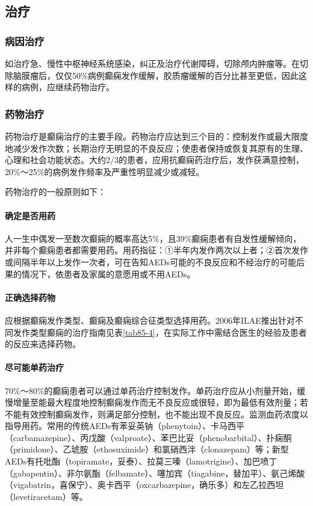 \subsection{治疗}

\subsubsection{病因治疗}

如治疗急、慢性中枢神经系统感染，纠正及治疗代谢障碍，切除颅内肿瘤等。在切除脑膜瘤后，仅仅50\%病例癫痫发作缓解，胶质瘤缓解的百分比甚至更低，因此这样的病例，应继续药物治疗。

\subsubsection{药物治疗}

药物治疗是癫痫治疗的主要手段。药物治疗应达到三个目的：控制发作或最大限度地减少发作次数；长期治疗无明显的不良反应；使患者保持或恢复其原有的生理、心理和社会功能状态。大约2/3的患者，应用抗癫痫药治疗后，发作获满意控制，20\%～25\%的病例发作频率及严重性明显减少或减轻。

药物治疗的一般原则如下：

\paragraph{确定是否用药}

人一生中偶发一至数次癫痫的概率高达5\%，且39\%癫痫患者有自发性缓解倾向，并非每个癫痫患者都需要用药。用药指征：①半年内发作两次以上者；②首次发作或间隔半年以上发作一次者，可在告知AEDs可能的不良反应和不经治疗的可能后果的情况下，依患者及家属的意愿用或不用AEDs。

\paragraph{正确选择药物}

应根据癫痫发作类型、癫痫及癫痫综合征类型选择用药。2006年ILAE推出针对不同发作类型癫痫的治疗指南见表\ref{tab85-4}，在实际工作中需结合医生的经验及患者的反应来选择药物。

\paragraph{尽可能单药治疗}

70\%～80\%的癫痫患者可以通过单药治疗控制发作。单药治疗应从小剂量开始，缓慢增量至能最大程度地控制癫痫发作而无不良反应或很轻，即为最低有效剂量；若不能有效控制癫痫发作，则满足部分控制，也不能出现不良反应。监测血药浓度以指导用药。常用的传统AEDs有苯妥英钠（phenytoin）、卡马西平（carbamazepine）、丙戊酸（valproate）、苯巴比妥（phenobarbital）、扑痫酮（primidone）、乙琥胺（ethosuximide）和氯硝西泮（clonazepam）等；新型AEDs有托吡酯（topiramate，妥泰）、拉莫三嗪（lamotrigine）、加巴喷丁（gabapentin）、非尔氨酯（felbamate）、噻加宾（tiagabine，替加平）、氨己烯酸（vigabatrin，喜保宁）、奥卡西平（oxcarbazepine，确乐多）和左乙拉西坦（levetiracetam）等。

